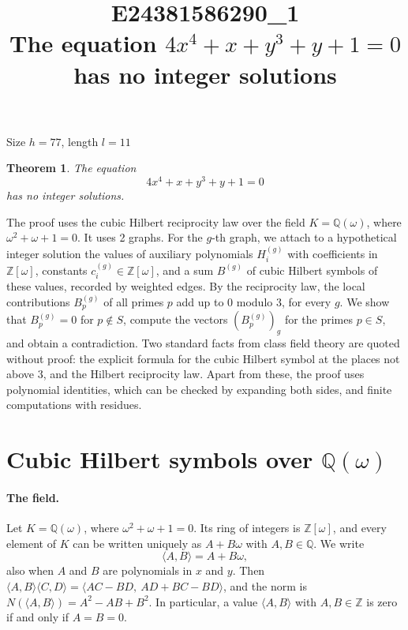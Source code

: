 \documentclass[11pt]{article}
\title{\textbf{E24381586290\_1}\\[4pt] {\Large The equation $4x^{4}+x+y^{3}+y+1=0$ has no integer solutions}}
\author{}
\date{}
\newtheorem{theorem}{Theorem}
\newcommand{\Z}{\mathbb{Z}}
\newcommand{\Q}{\mathbb{Q}}
\begin{document}
\maketitle
\vspace{-8ex}
\begin{center}
Size $h=77$, length $l=11$
\end{center}

\begin{theorem}\label{thm:main}
The equation
\begin{equation}\label{eq:main}
4x^{4}+x+y^{3}+y+1=0
\end{equation}
has no integer solutions.
\end{theorem}

The proof uses the cubic Hilbert reciprocity law over the field $K=\Q(\omega)$, where $\omega^2+\omega+1=0$. It uses 2 graphs. For the $g$-th graph, we attach to a hypothetical integer solution the values of auxiliary polynomials $H^{(g)}_i$ with coefficients in $\Z[\omega]$, constants $c^{(g)}_i\in\Z[\omega]$, and a sum $B^{(g)}$ of cubic Hilbert symbols of these values, recorded by weighted edges. By the reciprocity law, the local contributions $B^{(g)}_p$ of all primes $p$ add up to $0$ modulo $3$, for every $g$. We show that $B^{(g)}_p=0$ for $p\notin S$, compute the vectors $(B^{(g)}_p)_g$ for the primes $p\in S$, and obtain a contradiction. Two standard facts from class field theory are quoted without proof: the explicit formula for the cubic Hilbert symbol at the places not above $3$, and the Hilbert reciprocity law. Apart from these, the proof uses polynomial identities, which can be checked by expanding both sides, and finite computations with residues.


\section{\texorpdfstring{Cubic Hilbert symbols over $\Q(\omega)$}{Cubic Hilbert symbols over Q(w)}}\label{sec:symbols}

\paragraph{The field.} Let $K=\Q(\omega)$, where $\omega^2+\omega+1=0$. Its ring of integers is $\Z[\omega]$, and every element of $K$ can be written uniquely as $A+B\omega$ with $A,B\in\Q$. We write
\[
\langle A,B\rangle=A+B\omega,
\]
also when $A$ and $B$ are polynomials in $x$ and $y$. Then $\langle A,B\rangle\langle C,D\rangle=\langle AC-BD,\ AD+BC-BD\rangle$, and the norm is $N(\langle A,B\rangle)=A^2-AB+B^2$. In particular, a value $\langle A,B\rangle$ with $A,B\in\Z$ is zero if and only if $A=B=0$.
\end{document}
